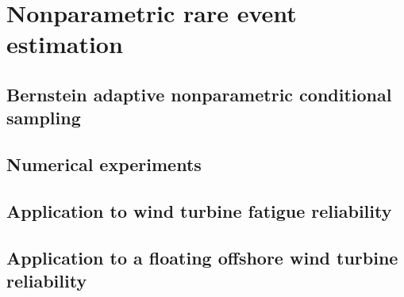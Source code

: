 \chapter{Nonparametric rare event estimation }
    \section{Bernstein adaptive nonparametric conditional sampling }
    \section{Numerical experiments }
    \section{Application to wind turbine fatigue reliability}
    \section{Application to a floating offshore wind turbine reliability}